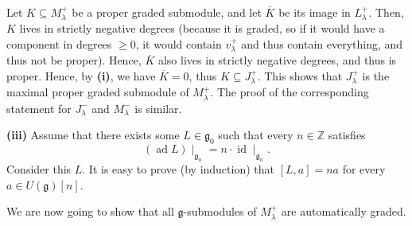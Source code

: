 \documentclass
[numbers=enddot,12pt,final,onecolumn,german,notitlepage]{scrartcl}%
\theoremstyle{definition}
\begin{document}
Let $K\subseteq M_{\lambda}^{+}$ be a proper graded submodule, and let
$\overline{K}$ be its image in $L_{\lambda}^{+}$. Then, $K$ lives in strictly
negative degrees (because it is graded, so if it would have a component in
degrees $\geq0$, it would contain $v_{\lambda}^{+}$ and thus contain
everything, and thus not be proper). Hence, $\overline{K}$ also lives in
strictly negative degrees, and thus is proper. Hence, by \textbf{(i)}, we have
$\overline{K}=0$, thus $K\subseteq J_{\lambda}^{+}$. This shows that
$J_{\lambda}^{+}$ is the maximal proper graded submodule of $M_{\lambda}^{+}$.
The proof of the corresponding statement for $J_{\lambda}^{-}$ and
$M_{\lambda}^{-}$ is similar.

\textbf{(iii)} Assume that there exists some $L\in\mathfrak{g}_{0}$ such that
every $n\in\mathbb{Z}$ satisfies
\[
\left(  \operatorname*{ad}L\right)  \mid_{\mathfrak{g}_{n}}=n\cdot
\operatorname*{id}\mid_{\mathfrak{g}_{n}}.
\]
Consider this $L$. It is easy to prove (by induction) that $\left[
L,a\right]  =na$ for every $a\in U\left(  \mathfrak{g}\right)  \left[
n\right]  $.

We are now going to show that all $\mathfrak{g}$-submodules of $M_{\lambda
}^{+}$ are automatically graded.
\end{document}
